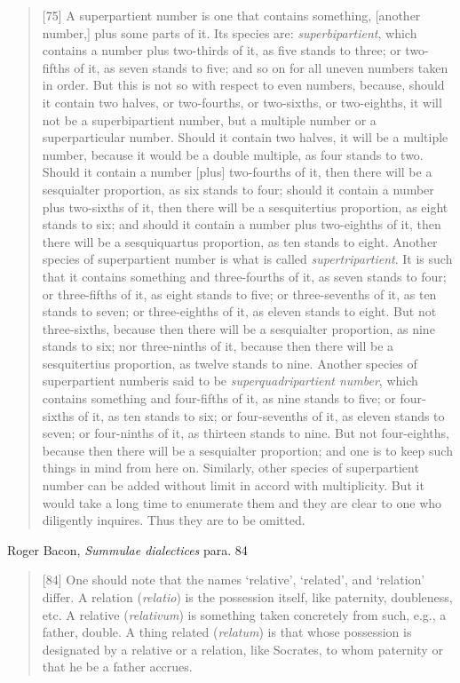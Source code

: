 \documentclass{article}
\theoremstyle{definition}
\begin{document}
\begin{quote}
[75] A superpartient number is one that contains something, [another number,] plus some parts of it. Its species are: {\em superbipartient}, which contains a number plus two-thirds of it, as five stands to three; or two-fifths of it, as seven stands to five; and so on for all uneven numbers taken
in order. But this is not so with respect to even numbers, because, should it contain two halves, or two-fourths, or two-sixths, or two-eighths, it will not be a superbipartient number, but a multiple number or a superparticular number. Should it contain two halves, it will be a multiple number, because it would be a double multiple, as four stands to two. Should it contain a number [plus] two-fourths of it, then there will be a sesquialter proportion, as six stands to four; should it contain a number plus two-sixths of it, then there will be a sesquitertius proportion, as eight stands to six; and should it contain a number plus two-eighths of it, then there will be a sesquiquartus proportion, as ten stands to eight. Another species of superpartient number
is what is called {\em supertripartient}. It is such that it contains something and three-fourths of it, as seven stands to four; or three-fifths of it, as eight stands to five; or three-sevenths of it, as ten stands to seven; or three-eighths of it, as eleven stands to eight. But not three-sixths, because then there will be a sesquialter proportion, as nine stands to six; nor three-ninths of it, because then there will be a sesquitertius proportion, as twelve stands to nine. Another species of superpartient numberis said to be {\em superquadripartient number}, which contains something and four-fifths of it, as nine stands to five; or four-sixths of it, as ten stands to six; or four-sevenths of it, as eleven stands to seven; or four-ninths of it, as thirteen stands to nine.
But not four-eighths, because then there will be a sesquialter proportion; and one is to keep such things in mind from here on. Similarly, other species of superpartient number can be added without limit in accord with multiplicity. But it would take a long time to enumerate them and they are clear to one who diligently inquires. Thus they are to be omitted.
\end{quote}

Roger Bacon, {\em Summulae dialectices} para. 84 \cite[p.~49]{MST47}

\begin{quote}
[84] One should note that the names `relative', `related', and `relation' differ. A relation ({\em relatio}) is the possession itself, like paternity, doubleness, etc. A relative ({\em relativum}) is something taken concretely from such, e.g., a father, double. A thing related ({\em relatum}) is that whose possession is designated by a relative or a relation, like Socrates, to whom paternity or that he be a father accrues.
\end{quote}
\end{document}
